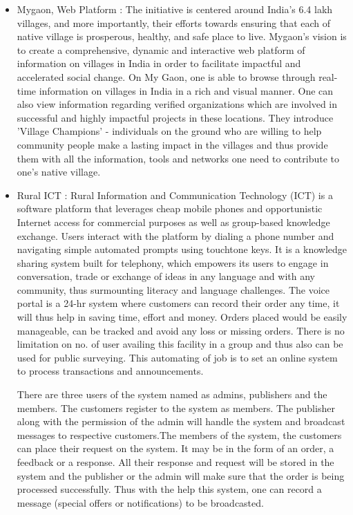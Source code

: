 \begin{itemize}
\item Mygaon, Web Platform \cite{MyGao25:online} : The initiative is centered around India's 6.4 lakh villages, and more importantly, their efforts towards ensuring that each of native village is prosperous, healthy, and safe place to live. Mygaon's vision is to create a comprehensive, dynamic and interactive web platform of information on villages in India in order to facilitate impactful and accelerated social change. On My Gaon, one is able to browse through real-time information on villages in India in a rich and visual manner. One can also view information regarding verified organizations which are involved in successful and highly impactful projects in these locations. They introduce 'Village Champions' - individuals on the ground who are willing to help community people make a lasting impact in the villages and thus provide them with all the information, tools and networks one need to contribute to one's native village.

\item Rural ICT : Rural Information and Communication Technology (ICT) is a software platform that leverages cheap mobile phones and opportunistic Internet access for commercial purposes as well as group-based knowledge exchange. Users interact with the platform by dialing a phone number and navigating simple automated prompts using touchtone keys. It is a knowledge sharing system built for telephony, which empowers its users to engage in conversation, trade or exchange of ideas in any language and with any community, thus surmounting literacy and language challenges. The voice portal is a 24-hr system where customers can record their order any time, it will thus help in saving time, effort and money. Orders placed would be easily manageable, can be tracked and avoid any loss or missing orders. There is no limitation on no. of user availing this facility in a group and thus also can be used for public surveying. This automating of job is to set an online system to process transactions and announcements.

There are three users of the system named as admins, publishers and the members. The customers register to the system as members. The publisher along with the permission of the admin will handle the system and broadcast messages to respective customers.The members of the system, the customers can place their request on the system. It may be in the form of an order, a feedback or a response. All their response and request will be stored in the system and the publisher or the admin will make sure that the order is being processed successfully. Thus with the help this system, one can record a message (special offers or notifications) to be broadcasted.


\end{itemize}
